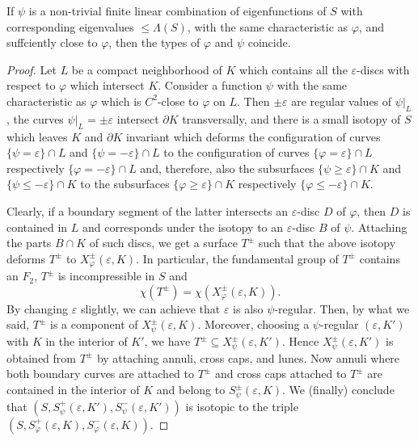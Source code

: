 \begin{lem}\label{isoto}
If $\psi$ is a non-trivial finite linear combination of eigenfunctions of $S$
with corresponding eigenvalues $\le\Lambda(S)$,
with the same characteristic as ${\varphi}$, and suffciently close to ${\varphi}$,
then the types of ${\varphi}$ and $\psi$ coincide.
\end{lem}

\begin{proof}
Let $L$ be a compact neighborhood of $K$
which contains all the ${\varepsilon}$-discs with respect to ${\varphi}$ which intersect $K$.
Consider a function $\psi$ with the same characteristic as ${\varphi}$
which is $C^2$-close to ${\varphi}$ on $L$.
Then $\pm{\varepsilon}$ are regular values of $\psi|_L$,
the curves $\psi|_L=\pm{\varepsilon}$ intersect $\partial K$ transversally,
and there is a small isotopy of $S$ which leaves $K$ and $\partial K$ invariant
which deforms the configuration of curves $\{\psi={\varepsilon}\}\cap L$ and $\{\psi=-{\varepsilon}\}\cap L$
to the configuration of curves $\{{\varphi}={\varepsilon}\}\cap L$ respectively $\{{\varphi}=-{\varepsilon}\}\cap L$
and, therefore, also the subsurfaces $\{\psi\ge{\varepsilon}\}\cap K$ and $\{\psi\le-{\varepsilon}\}\cap K$
to the subsurfaces $\{{\varphi}\ge{\varepsilon}\}\cap K$ respectively $\{{\varphi}\le-{\varepsilon}\}\cap K$.

Clearly, if a boundary segment of the latter intersects an ${\varepsilon}$-disc $D$ of ${\varphi}$,
then $D$ is contained in $L$ and corresponds under the isotopy to an ${\varepsilon}$-disc $B$ of $\psi$.
Attaching the parts $B\cap K$ of such discs, we get a surface $T^\pm$
such that the above isotopy deforms $T^\pm$ to $X_{\varphi}^\pm({\varepsilon},K)$.
In particular, the fundamental group of $T^\pm$ contains an $F_2$,
$T^\pm$ is incompressible in $S$ and
\begin{equation*}
  \chi(T^\pm)=\chi(X_{\varphi}^\pm({\varepsilon},K)).
\end{equation*}
By changing ${\varepsilon}$ slightly, we can achieve that ${\varepsilon}$ is also $\psi$-regular.
Then, by what we said, $T^\pm$ is a component of $X_\psi^\pm({\varepsilon},K)$.
Moreover, choosing a $\psi$-regular $({\varepsilon},K')$ with $K$ in the interior of $K'$,
we have $T^\pm\subseteq X_\psi^\pm({\varepsilon},K')$.
Hence $X_\psi^\pm({\varepsilon},K')$ is obtained from $T^\pm$ by attaching annuli,
cross caps, and lunes.
Now annuli where both boundary curves are attached to $T^\pm$ and cross caps
attached to $T^\pm$ are contained in the interior of $K$ and belong to $S_\psi^\pm({\varepsilon},K)$.
We (finally) conclude that $(S,S_\psi^+({\varepsilon},K'),S_\psi^-({\varepsilon},K'))$ is isotopic to
the triple $(S,S_{\varphi}^+({\varepsilon},K),S_{\varphi}^-({\varepsilon},K))$.
\end{proof}

